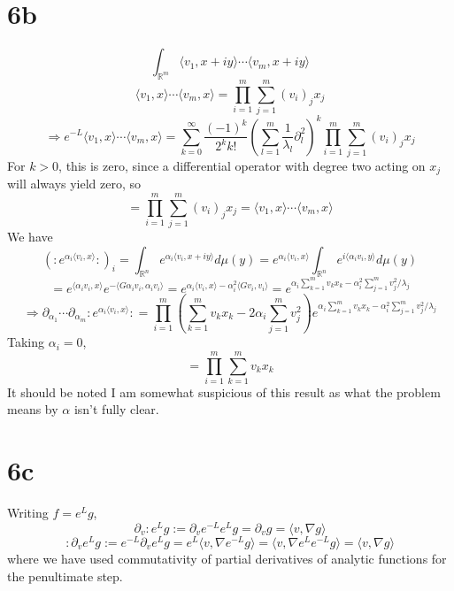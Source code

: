 \documentclass{article}
\begin{document}
\section*{6b}
\[
  \int_{\mathbb{R}^{m}}\langle v_{1},x+iy \rangle\cdots\langle v_{m},x+iy \rangle
\]
\[
  \langle v_{1},x \rangle\cdots\langle v_{m},x \rangle=\prod_{i=1}^{m}\sum_{j=1}^{m}(v_{i})_{j}x_{j}
\]
\[
  \Rightarrow e^{-L}\langle v_{1},x \rangle\cdots\langle v_{m},x \rangle
  =\sum_{k=0}^{\infty}\frac{(-1)^{k}}{2^{k}k!}\left( \sum_{l=1}^{m}\frac{1}{\lambda_{l}}\partial_{l}^{2} \right)^{k}
  \prod_{i=1}^{m}\sum_{j=1}^{m}(v_{i})_{j}x_{j}
\]
For $k>0$, this is zero, since a differential operator with degree two acting on $x_{j}$ will always yield zero, so
\[
  =\prod_{i=1}^{m}\sum_{j=1}^{m}(v_{i})_{j}x_{j}
  =\langle v_{1},x \rangle\cdots\langle v_{m},x \rangle
\]
We have
\[
  (:e^{\alpha_{i}\langle v_{i},x \rangle}:)_{i}=\int_{\mathbb{R}^{n}}e^{\alpha_{i}\langle v_{i},x+iy \rangle}d\mu(y)
  =e^{\alpha_{i}\langle v_{i},x \rangle}\int_{\mathbb{R}^{n}}e^{i\langle \alpha_{i}v_{i}, y\rangle}d\mu(y)
\]
\[
  =e^{\langle \alpha_{i}v_{i},x\rangle}e^{-\langle G\alpha_{i}v_{i},\alpha_{i}v_{i} \rangle}
  =e^{\alpha_{i}\langle v_{i},x \rangle-\alpha_{i}^{2}\langle Gv_{i},v_{i}  \rangle}
  =e^{\alpha_{i}\sum_{k=1}^{m}v_{k}x_{k}-\alpha_{i}^{2}\sum_{j=1}^{m}v_j^{2}/\lambda_{j}}
\]
\[
  \Rightarrow \partial_{\alpha_{1}}\cdots\partial_{\alpha_{m}}:e^{\alpha_{i}\langle v_{i},x \rangle}:
  =\prod_{i=1}^{m}\left(\sum_{k=1}^{m}v_{k}x_{k}-2\alpha_{i}\sum_{j=1}^{m}v_{j}^{2}\right)
  e^{\alpha_{i}\sum_{k=1}^{m}v_{k}x_{k}-\alpha_{i}^{2}\sum_{j=1}^{m}v_j^{2}/\lambda_{j}}
\]
Taking $\alpha_{i}=0$,
\[
  =\prod_{i=1}^{m}\sum_{k=1}^{m}v_{k}x_{k}
\]
It should be noted I am somewhat suspicious of this result as what the problem means by $\alpha$ isn't fully clear.

\section*{6c}
Writing $f=e^{L}g$,
\[
  \partial_{v}:e^{L}g:=\partial_{v}e^{-L}e^{L}g=\partial_{v}g=\langle v,\nabla g \rangle
\]
\[
  :\partial_{v}e^{L}g:=e^{-L}\partial_{v}e^{L}g=e^{L}\langle v,\nabla e^{-L}g \rangle=\langle v, \nabla e^{L}e^{-L}g  \rangle
  =\langle v,\nabla g \rangle
\]
where we have used commutativity of partial derivatives of analytic functions for the penultimate step.
\end{document}
